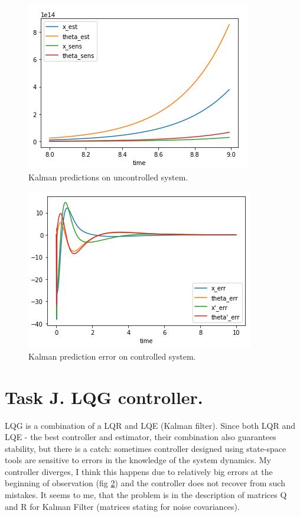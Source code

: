 \documentclass[12pt,letterpaper]{article}
\begin{document}
    \begin{figure}[htb]
        \centering
        \includegraphics[width=0.5\linewidth]{images/filter/kalman_uncontrolled.jpg}
        \caption{Kalman predictions on uncontrolled system.}
        \label{fig:kalman_uncontrolled}
    \end{figure}
    
    \begin{figure}[htb]
        \centering
        \includegraphics[width=0.5\linewidth]{images/filter/kalman_prediction_error.jpg}
        \caption{Kalman prediction error on controlled system.}
        \label{fig:kalman_prediction_error}
    \end{figure}
    
\section*{Task J. LQG controller.}
\label{Q:J}
    LQG is a combination of a LQR and LQE (Kalman filter). Since both LQR and LQE - the best controller and estimator, their combination also guarantees stability, but there is a catch: sometimes controller designed using state-space tools are sensitive to errors in the knowledge of the system dynamics. My controller diverges, I think this happens due to relatively big errors at the beginning of observation (fig \ref{fig:kalman_prediction_error}) and the controller does not recover from such mistakes. It seems to me, that the problem is in the description of matrices Q and R for Kalman Filter (matrices stating for noise covariances).
\end{document}
